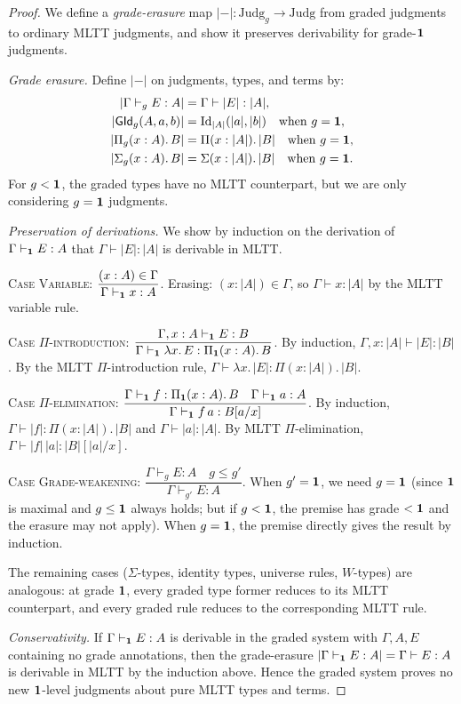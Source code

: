 \begin{proof}
We define a \emph{grade-erasure} map $|-| : \mathrm{Judg}_g \to
\mathrm{Judg}$ from graded judgments to ordinary MLTT judgments,
and show it preserves derivability for grade-$\mathbf{1}$ judgments.

\emph{Grade erasure.}  Define $|-|$ on judgments, types, and terms by:
\begin{align*}
  |\Gamma \vdash_g E : A| &= \Gamma \vdash |E| : |A|, \\
  |\mathsf{GId}_g(A, a, b)| &= \mathrm{Id}_{|A|}(|a|, |b|)
    \quad\text{when } g = \mathbf{1}, \\
  |\Pi_g(x : A).\, B| &= \Pi(x : |A|).\, |B|
    \quad\text{when } g = \mathbf{1}, \\
  |\Sigma_g(x : A).\, B| &= \Sigma(x : |A|).\, |B|
    \quad\text{when } g = \mathbf{1}.
\end{align*}
For $g < \mathbf{1}$, the graded types have no MLTT counterpart, but we
are only considering $g = \mathbf{1}$ judgments.

\emph{Preservation of derivations.}  We show by induction on the
derivation of $\Gamma \vdash_{\mathbf{1}} E : A$ that
$\Gamma \vdash |E| : |A|$ is derivable in MLTT.

\textsc{Case Variable:}
$\dfrac{(x : A) \in \Gamma}{\Gamma \vdash_{\mathbf{1}} x : A}$.
Erasing: $(x : |A|) \in \Gamma$, so $\Gamma \vdash x : |A|$ by the
MLTT variable rule.

\textsc{Case $\Pi$-introduction:}
$\dfrac{\Gamma, x : A \vdash_{\mathbf{1}} E : B}
  {\Gamma \vdash_{\mathbf{1}} \lambda x.\, E : \Pi_{\mathbf{1}}(x:A).\, B}$.
By induction, $\Gamma, x : |A| \vdash |E| : |B|$.  By the MLTT
$\Pi$-introduction rule,
$\Gamma \vdash \lambda x.\, |E| : \Pi(x:|A|).\, |B|$.

\textsc{Case $\Pi$-elimination:}
$\dfrac{\Gamma \vdash_{\mathbf{1}} f : \Pi_{\mathbf{1}}(x:A).\, B \quad
  \Gamma \vdash_{\mathbf{1}} a : A}
  {\Gamma \vdash_{\mathbf{1}} f\,a : B[a/x]}$.
By induction, $\Gamma \vdash |f| : \Pi(x:|A|).\,|B|$ and
$\Gamma \vdash |a| : |A|$.  By MLTT $\Pi$-elimination,
$\Gamma \vdash |f|\,|a| : |B|[|a|/x]$.

\textsc{Case Grade-weakening:}
$\dfrac{\Gamma \vdash_g E : A \quad g \leq g'}
  {\Gamma \vdash_{g'} E : A}$.
When $g' = \mathbf{1}$, we need $g = \mathbf{1}$ (since $\mathbf{1}$ is maximal
and $g \leq \mathbf{1}$ always holds; but if $g < \mathbf{1}$, the premise
has grade $< \mathbf{1}$ and the erasure may not apply).  When
$g = \mathbf{1}$, the premise directly gives the result by induction.

The remaining cases ($\Sigma$-types, identity types, universe rules,
$W$-types) are analogous: at grade $\mathbf{1}$, every graded type former
reduces to its MLTT counterpart, and every graded rule reduces to
the corresponding MLTT rule.

\emph{Conservativity.}  If $\Gamma \vdash_{\mathbf{1}} E : A$ is
derivable in the graded system with $\Gamma, A, E$ containing no
grade annotations, then the grade-erasure $|\Gamma \vdash_{\mathbf{1}}
E : A| = \Gamma \vdash E : A$ is derivable in MLTT by the induction
above.  Hence the graded system proves no new $\mathbf{1}$-level judgments
about pure MLTT types and terms.
\end{proof}

